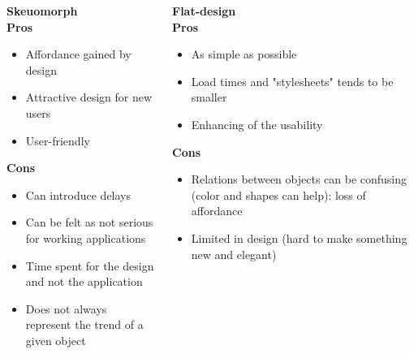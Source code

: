 \documentclass{beamer}
\begin{document}
    \begin{frame}
      \begin{columns}[t]
          \begin{column}{5cm}
           \Large\textbf{Skeuomorph\\}
           \normalsize
             	\textbf{Pros}
                  \begin{itemize}
                  \item Affordance gained by design
                  \item Attractive design for new users
                  \item User-friendly
                  \end{itemize}
                  \textbf{Cons}
                  \begin{itemize}
                  \item Can introduce delays
                  \item Can be felt as not serious for working applications
                  \item Time spent for the design and not the application
                  \item Does not always represent the trend of a given object
                  \end{itemize}
            \end{column}
            \begin{column}{5cm}
          \LARGE\textbf{Flat-design\\}
          \normalsize
       \textbf{Pros}
          \begin{itemize}
          \item As simple as possible
          \item Load times and "stylesheets" tends to be smaller
          \item Enhancing of the usability
          \end{itemize}
          \textbf{Cons}
          \begin{itemize}
              \item Relations between objects can be confusing (color and shapes can help): loss of affordance
          \item Limited in design (hard to make something new and elegant)
          \end{itemize}
       \end{column}
      
       
\end{columns}
   
    \end{frame}
\end{document}
